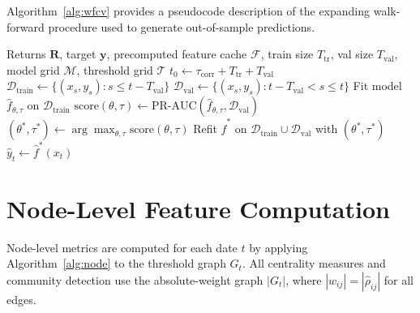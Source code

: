 \documentclass{article}
\begin{document}
Algorithm~\ref{alg:wfcv} provides a pseudocode description of the expanding walk-forward procedure used to generate out-of-sample predictions.

\begin{algorithm}[H]
\caption{Expanding Walk-Forward Cross-Validation}
\label{alg:wfcv}
\begin{algorithmic}[1]
\Require Returns $\mathbf{R}$, target $\mathbf{y}$, precomputed feature cache $\mathcal{F}$,
         train size $T_{\text{tr}}$, val size $T_{\text{val}}$, model grid $\mathcal{M}$, threshold grid $\mathcal{T}$
\State $t_0 \leftarrow \tau_{\text{corr}} + T_{\text{tr}} + T_{\text{val}}$
    \State $\mathcal{D}_{\text{train}} \leftarrow \{(x_s, y_s) : s \leq t - T_{\text{val}}\}$ 
    \State $\mathcal{D}_{\text{val}} \leftarrow \{(x_s, y_s) : t - T_{\text{val}} < s \leq t\}$ 
        \State Fit model $\hat{f}_{\theta,\tau}$ on $\mathcal{D}_{\text{train}}$
        \State $\text{score}(\theta, \tau) \leftarrow \text{PR-AUC}\!\left(\hat{f}_{\theta,\tau}, \mathcal{D}_{\text{val}}\right)$
    \EndFor
    \State $(\theta^*, \tau^*) \leftarrow \arg\max_{\theta, \tau} \text{score}(\theta, \tau)$
    \State Refit $\hat{f}^*$ on $\mathcal{D}_{\text{train}} \cup \mathcal{D}_{\text{val}}$ with $(\theta^*, \tau^*)$
    \State $\hat{y}_t \leftarrow \hat{f}^*(x_t)$ 
\EndFor
\end{algorithmic}
\end{algorithm}


\section{Node-Level Feature Computation}
\label{app:node}

Node-level metrics are computed for each date $t$ by applying Algorithm~\ref{alg:node} to the threshold graph $G_t$. All centrality measures and community detection use the absolute-weight graph $|G_t|$, where $|w_{ij}| = |\hat\rho_{ij}|$ for all edges.
\end{document}
